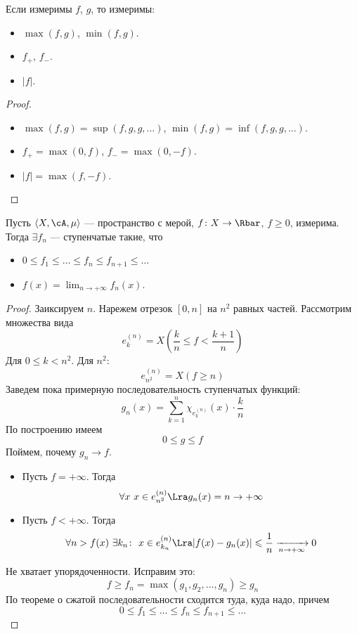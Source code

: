 \begin{corollary}
	Если измеримы $f$, $g$, то измеримы:
	\begin{itemize}
		\item $\max(f, g)$, $\min(f, g)$.
		\item $f_{+}$, $f_{-}$.
		\item $|f|$.
	\end{itemize}
\end{corollary}
\begin{proof}
	\enewline
	\begin{itemize}
		\item $\max(f, g) = \sup(f, g, g, \ldots)$, $\min(f, g) = \inf(f, g, g, \ldots)$.
		\item $f_{+} = \max(0, f)$, $f_{-} = \max(0, -f)$.
		\item $|f| = \max(f, -f)$.
	\end{itemize}
\end{proof}

\begin{theorem}
	Пусть $\langle X, \cA, \mu \rangle$ --- пространство с мерой, 
	$f \colon X \to \Rbar$, $f \geqslant 0$, измерима. Тогда
	$\exists f_n$ --- ступенчатые такие, что
\begin{itemize}
	\item $0 \leqslant f_1 \leqslant \ldots \leqslant f_n \leqslant f_{n + 1}
		\leqslant \ldots$
	\item $\displaystyle f(x) = \lim_{n \to +\infty}{f_n(x)}$.
\end{itemize}
\end{theorem}
\begin{proof}
	Заиксируем $n$.	Нарежем отрезок $[0, n]$ на $n^2$ равных частей. 
	Рассмотрим множества вида
\[
	e^{(n)}_k = X\left(\frac{k}{n} \leqslant f < \frac{k + 1}{n}\right)
\]
	Для $0 \leqslant k < n^2$. Для $n^2$:
\[
	e^{(n)}_{n^2} = X(f \geqslant n)
\]
	Заведем пока примерную последовательность ступенчатых функций:
\[
	g_n(x) = \sum_{k = 1}^{n}{\chi_{e^{(n)}_k}(x) \cdot \frac{k}{n}}
\]
	По построению имеем
\[
	0 \leqslant g \leqslant f
\]
	Поймем, почему $g_n \to f$.
	\begin{itemize}
		\item Пусть $f = +\infty$. Тогда
\[
	\forall x~ x \in e^{(n)}_{n^2} \Lra g_n(x) = n \to +\infty
\]
		\item Пусть $f < +\infty$. Тогда
\[
	\forall n > f(x)~ \exists k_n\colon~ x \in e^{(n)}_{k_n} \Lra
	|f(x) - g_n(x)| \leqslant \frac{1}{n} \xrightarrow[n \to +\infty]{} 0
\]
	\end{itemize}
	Не хватает упорядоченности. Исправим это:
\[
	f \geqslant f_n = \max(g_1, g_2, \ldots, g_n) \geqslant g_n
\]
	По теореме о сжатой последовательности сходится туда, куда надо,
	причем
\[
	0 \leqslant f_1 \leqslant \ldots \leqslant f_n \leqslant f_{n + 1} \leqslant 
	\ldots
\]
\end{proof}

